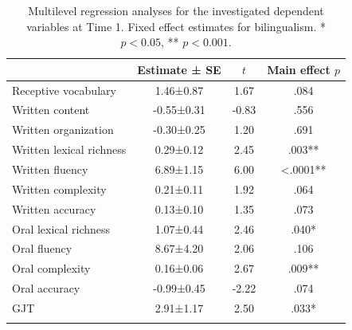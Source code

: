 \documentclass[output=paper,modfonts,nonflat,newtxmath]{langsci/langscibook}
\begin{document}
\begin{table}
	\caption{\label{tab:pfenninger:5}Multilevel regression analyses for the investigated dependent variables at Time 1. Fixed effect estimates for bilingualism. * $p <0.05$, ** $p<0.001$.}
    \begin{tabular}{lS[table-format=-1.3,parse-numbers=false]SS[table-format=<1.4]}
		\lsptoprule
       & {Estimate ± SE} & {$t$}  & {Main effect $p$}\\\midrule
		Receptive vocabulary & 1.46±0.87 & 1.67 & .084\\
		Written content & -0.55±0.31 & -0.83 & .556 \\
		Written organization & -0.30±0.25 & 1.20 & .691\\
		Written lexical richness & 0.29±0.12 & 2.45 & .003**\\
		Written fluency & 6.89±1.15 & 6.00 & <.0001**\\
		Written complexity & 0.21±0.11 & 1.92 & .064\\
		Written accuracy & 0.13±0.10 & 1.35 & .073\\
		Oral lexical richness & 1.07±0.44 & 2.46 & .040*\\
		Oral fluency & 8.67±4.20 & 2.06 & .106\\
		Oral complexity & 0.16±0.06 & 2.67 & .009**\\
		Oral accuracy & -0.99±0.45 & -2.22 & .074\\
		GJT & 2.91±1.17 & 2.50 & .033*\\
		\lspbottomrule
	\end{tabular}
\end{table}
\end{document}
